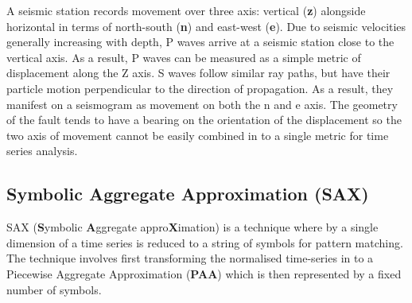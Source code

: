 \documentclass[11pt]{scrartcl}
\begin{document}
	A seismic station records movement over three axis: vertical (\textbf{z}) alongside horizontal in terms of north-south (\textbf{n}) and east-west (\textbf{e}).  Due to seismic velocities generally increasing with depth, P waves arrive at a seismic station close to the vertical axis.  As a result, P waves can be measured as a simple metric of displacement along the Z axis.  S waves follow similar ray paths, but have their particle motion perpendicular to the direction of propagation.  As a result, they manifest on a seismogram as movement on both the n and e axis. The geometry of the fault tends to have a bearing on the orientation of the displacement so the two axis of movement cannot be easily combined in to a single metric for time series analysis.
	
\subsection{Symbolic Aggregate Approximation (SAX)}
	SAX (\textbf{S}ymbolic \textbf{A}ggregate appro\textbf{X}imation) \citep{sax} is a technique where by a single dimension of a time series is reduced to a string of symbols for pattern matching.  The technique involves first transforming the normalised time-series in to a Piecewise Aggregate Approximation (\textbf{PAA}) which is then represented by a fixed number of symbols.
	
\end{document}

